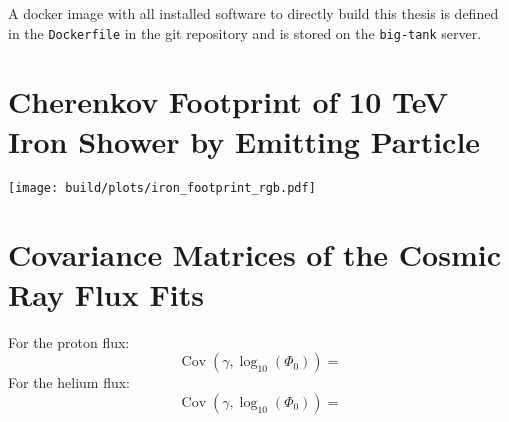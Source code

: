 A docker image with all installed software to directly build this thesis
is defined in the \texttt{Dockerfile} in the git repository and is stored
on the \texttt{big-tank} server. 

\section{Cherenkov Footprint of 10 TeV Iron Shower by Emitting Particle}
\begin{center}
  \texttt{[image: build/plots/iron\_footprint\_rgb.pdf]}
  \label{apx:iron-rgb}
\end{center}

\section{Covariance Matrices of the Cosmic Ray Flux Fits}\label{apx:fit-results}

For the proton flux:
\begin{equation}
  \operatorname{Cov}(γ, \log_{10}(Φ_0)) = 
\end{equation}
For the helium flux:
\begin{equation}
  \operatorname{Cov}(γ, \log_{10}(Φ_0)) = 
\end{equation}

